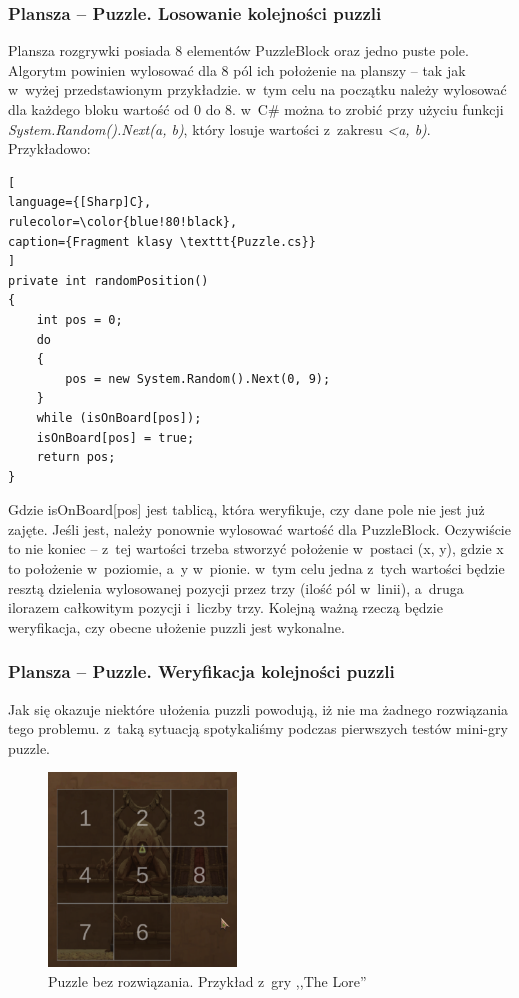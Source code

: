 \documentclass[oneside,polski,logo]{amuthesis}
\begin{document}
\subsubsection{Plansza – Puzzle. Losowanie kolejności puzzli}
\par Plansza rozgrywki posiada 8 elementów PuzzleBlock oraz jedno puste pole.  Algorytm powinien wylosować dla 8 pól ich położenie na planszy – tak jak w~wyżej przedstawionym przykładzie. w~tym celu na początku należy wylosować dla każdego bloku wartość od 0 do 8. w~C\# można to zrobić przy użyciu funkcji  \emph{System.Random().Next(a, b)}, który losuje wartości z~zakresu \emph{<a, b)}. Przykładowo:
\begin{lstlisting}[
language={[Sharp]C},
rulecolor=\color{blue!80!black},
caption={Fragment klasy \texttt{Puzzle.cs}}
]
private int randomPosition()
{
    int pos = 0;
    do
    {
        pos = new System.Random().Next(0, 9);
    }
    while (isOnBoard[pos]);
    isOnBoard[pos] = true;
    return pos;
}
\end{lstlisting}

Gdzie isOnBoard[pos] jest tablicą, która weryfikuje, czy dane pole nie jest już zajęte. Jeśli jest, należy ponownie wylosować wartość dla PuzzleBlock. Oczywiście to nie koniec – z~tej wartości trzeba stworzyć położenie w~postaci (x, y), gdzie x to położenie w~poziomie, a~y w~pionie. w~tym celu jedna z~tych wartości będzie resztą dzielenia wylosowanej pozycji przez trzy (ilość pól w~linii), a~druga ilorazem całkowitym pozycji i~liczby trzy. 
Kolejną ważną rzeczą będzie weryfikacja, czy obecne ułożenie puzzli jest wykonalne.

\subsubsection{Plansza – Puzzle. Weryfikacja kolejności puzzli}
\par Jak się okazuje niektóre ułożenia puzzli powodują, iż nie ma żadnego rozwiązania tego problemu. z~taką sytuacją spotykaliśmy podczas pierwszych testów mini-gry puzzle. 
\begin{figure}[h]
	\centering
	\includegraphics[width=5cm]{images/tyrek/puzzle_1.png}
	\caption{Puzzle bez rozwiązania. Przykład z~gry ,,The Lore''}
\end{figure}
\end{document}
